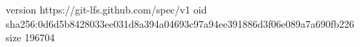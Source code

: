 version https://git-lfs.github.com/spec/v1
oid sha256:0d6d5b8428033ee031d8a394a04693c97a94ee391886d3f06e089a7a690fb226
size 196704
